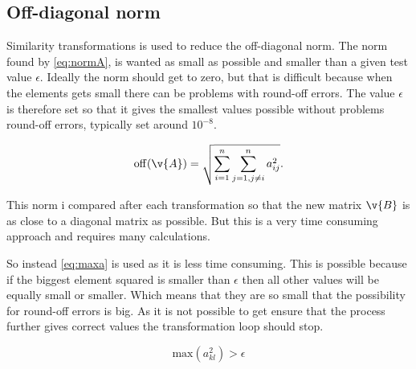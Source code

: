 

\subsection*{Off-diagonal norm}

Similarity transformations is used to reduce the off-diagonal norm. The norm found by \eqref{eq:normA}, is wanted as small as possible and smaller than a given test value $\epsilon$. Ideally the norm should get to zero, but that is difficult because when the elements gets small there can be problems with round-off errors. The value $\epsilon$ is therefore set so that it gives the smallest values possible without problems round-off errors, typically set around $10^{-8}$.  

\begin{equation}


\mathrm{off}(\v{A}) = \sqrt{\sum_{i=1}^n\sum_{j=1,j\ne i}^n a_{ij}^2}.
\label{eq:normA}

\end{equation} 


This norm i compared after each transformation so that the new matrix $\v{B}$ is as close to a diagonal matrix as possible. But this is a very time consuming approach and requires many calculations. 

So instead \eqref{eq:maxa} is used as it is less time consuming. This is possible because if the biggest element squared is smaller than $\epsilon$ then all other values will be equally small or smaller. Which means that they are so small that the possibility for round-off errors is big. As it is not possible to get ensure that the process further gives correct values the transformation loop should stop. 

\begin{equation}

\mathrm{max}(a_{kl}^2) > \epsilon
\label{eq:maxa}

\end{equation}



